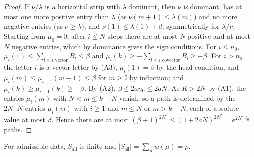 \begin{proof}
If $\nu/\lambda$ is a horizontal strip with $\lambda$ dominant, then $\nu$ is dominant, has at most one more positive entry than
$\lambda$ (as $\nu(m+1)\le\lambda(m)$) and no more negative entries (as $\nu\ge\lambda$), and $\nu(1)\le\lambda(1)+d$; symmetrically
for $\lambda/\nu$. Starting from $\mu_0=0$, after $i\le N$ steps there are at most $N$ positive and at most $N$ negative entries,
which by dominance gives the sign conditions. For $i\le n_0$, $\mu_i(1)\le\sum_{l\le i\text{ vector}}B_l\le\beta$ and
$\mu_i(k)\ge-\sum_{l\le i\text{ covector}}B_l\ge-\beta$. For $i>n_0$ the letter $i$ is a vector letter by (A3), $\mu_i(1)=\beta$ by
the head condition, and $\mu_i(m)\le\mu_{i-1}(m-1)\le\beta$ for $m\ge2$ by induction; and $\mu_i(k)\ge\mu_{i-1}(k)\ge-\beta$. By (A2),
$\beta\le2an_0\le2aN$. As $K>2N$ by (A1), the entries $\mu_i(m)$ with $N<m\le k-N$ vanish, so a path is determined by the
$2N\cdot N$ entries $\mu_i(m)$ with $i\ge1$ and $m\le N$ or $m>k-N$, each of absolute value at most $\beta$. Hence there are at
most $(\beta+1)^{2N^2}\le(1+2aN)^{2N^2}=e^{2N^2\ell_0}$ paths.
\end{proof}

\begin{lemma}\label{pf:linkG:totalweight}
For admissible data, $S_{\mathrm{all}}$ is finite and $|S_{\mathrm{all}}|=\sum_\mu w(\mu)=\rho$.
\end{lemma}

